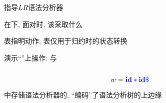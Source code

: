 \begin{frame}{}
  \begin{center}
    指导$LR$语法分析器

    \vspace{0.30cm}

    \vspace{0.10cm}
    在下, 面对时, 该采取什么

    \vspace{0.30cm}
    \violet{\action{}} 表指明动作, \violet{\goto{}} 表仅用于归约时的状态转换
  \end{center}
\end{frame}

\begin{frame}{}
  \begin{center}

    \vspace{0.30cm}
    
  \end{center}
\end{frame}

\begin{frame}{}
  \begin{center}
    演示``''上操作: 与

    \begin{columns}
        
    \end{columns}

    \[
      w = \textcolor{blue}{\text{\bf id} \ast \text{\bf id} \$}
    \]

    中存储语法分析器的, ``编码''了语法分析树的上边缘
  \end{center}
\end{frame}

\begin{frame}{}
  \begin{center}
    
  \end{center}
\end{frame}

